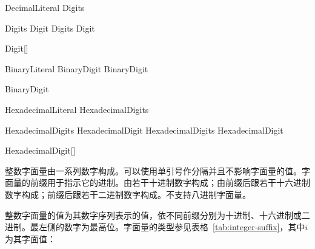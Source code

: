 \begin{bnf}{DecimalLiteral}
    Digits
\end{bnf}

\begin{bnf}{Digits}
    Digit \br
    Digits \bnfq Digit
\end{bnf}

\begin{bnf}{Digit}[\oneof]
\end{bnf}

\begin{bnf}{BinaryLiteral}
     BinaryDigit \bnflp{}\bnfq BinaryDigit\bnfrp\bnfs
\end{bnf}

\begin{bnf}{BinaryDigit}
     \br
\end{bnf}

\begin{bnf}{HexadecimalLiteral}
     HexadecimalDigits
\end{bnf}

\begin{bnf}{HexadecimalDigits}
    HexadecimalDigit \br
    HexadecimalDigits \bnfs HexadecimalDigit
\end{bnf}

\begin{bnf}{HexadecimalDigit}[\oneof]
     \br
     \br
\end{bnf}

\pnum
整数字面量由一系列数字构成。可以使用单引号作分隔并且不影响字面量的值。字面量的前缀用于指示它的进制。由若干十进制数字构成；由前缀后跟若干十六进制数字构成；前缀后跟若干二进制数字构成。\X 不支持八进制字面量。

\pnum
整数字面量的值为其数字序列表示的值，依不同前缀分别为十进制、十六进制或二进制。最左侧的数字为最高位。字面量的类型参见表格~\ref{tab:integer-suffix}，其中$i$为其字面值：

